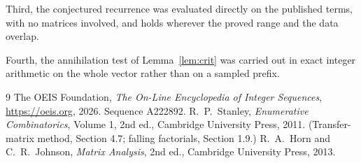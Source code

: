 \documentclass[11pt,a4paper]{article}
\theoremstyle{plain}
\theoremstyle{definition}
\begin{document}
Third, the conjectured recurrence was evaluated directly on the published terms, with no
matrices involved, and holds wherever the proved range and the data overlap.

Fourth, the annihilation test of Lemma~\ref{lem:crit} was carried out in exact integer
arithmetic on the whole vector rather than on a sampled prefix.

\begin{thebibliography}{9}
 The OEIS Foundation, \emph{The On-Line Encyclopedia of Integer
Sequences}, \url{https://oeis.org}, 2026. Sequence A222892.
 R.~P.~Stanley, \emph{Enumerative Combinatorics}, Volume 1, 2nd ed.,
Cambridge University Press, 2011. (Transfer-matrix method, Section 4.7; falling factorials,
Section 1.9.)
 R.~A.~Horn and C.~R.~Johnson, \emph{Matrix Analysis}, 2nd ed., Cambridge
University Press, 2013.
\end{thebibliography}
\end{document}
